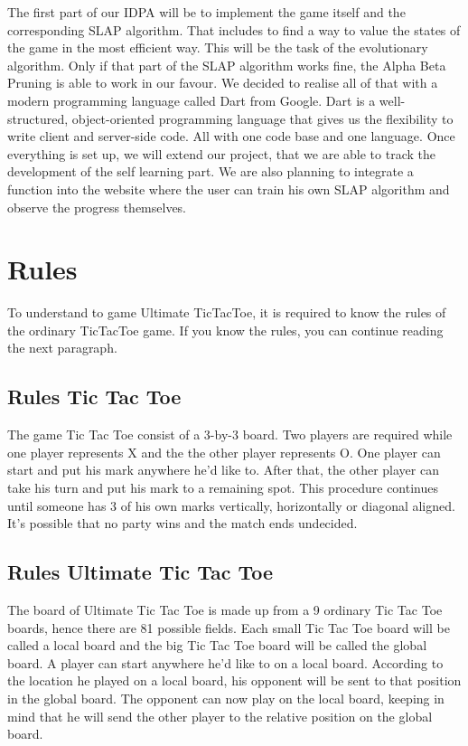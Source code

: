 The first part of our IDPA will be to implement the game itself and the corresponding SLAP algorithm. 
That includes to find a way to value the states of the game in the most efficient way. This will be the task of the evolutionary algorithm. Only if that part of the SLAP algorithm works fine, the Alpha Beta Pruning is able to work in our favour.
We decided to realise all of that with a modern programming language called Dart from Google. Dart is a well-structured, object-oriented programming language that gives us the flexibility to write client and server-side code. All with one code base and one language. Once everything is set up, we will extend our project, that we are able to track the development of the self learning part. We are also planning to integrate a function into the website where the user can train his own SLAP algorithm and observe the progress themselves.

\section{Rules}
To understand to game Ultimate TicTacToe, it is required to  know the rules of the ordinary TicTacToe game. If you know the rules, you can continue reading the next paragraph. 

\subsection {Rules Tic Tac Toe}
The game Tic Tac Toe consist of a 3-by-3 board. Two players are required while one player represents X and the the other player represents O. One player can start and put his mark anywhere he'd like to. After that, the other player can take his turn and put his mark to a remaining spot. This procedure continues until someone has 3 of his own marks vertically, horizontally or diagonal aligned. It's possible that no party wins and the match ends undecided.

\subsection {Rules Ultimate Tic Tac Toe}
The board of Ultimate Tic Tac Toe is made up from a 9 ordinary Tic Tac Toe boards, hence there are 81 possible fields.
Each small Tic Tac Toe board will be called a local board and the big Tic Tac Toe board will be called the global board.
A player can start anywhere he'd like to on a local board. According to the location he played on a local board, his opponent will be sent to that position in the global board. The opponent can now play on the local board, keeping in mind that he will send the other player to the relative position on the global board. 

